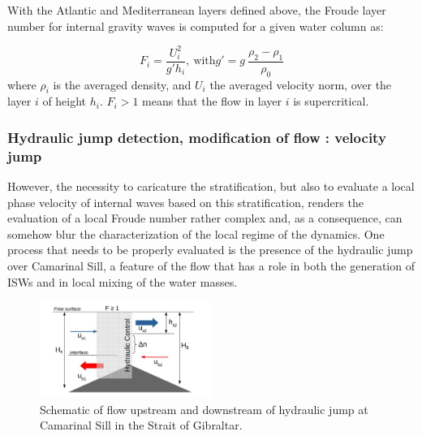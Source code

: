 With the Atlantic and Mediterranean layers defined above, the Froude layer number for internal gravity waves is computed for a given water column as: 

\begin{equation}
F_i=\frac{U_i^2}{g'h_i} , \ \text{with} g'=g \ \frac{\rho_2-\rho_1}{\rho_0}
\end{equation}
where $\rho_i$ is the averaged density, and  $U_i$ the averaged velocity norm, over the layer $i$ of height $h_i$. $F_i>1$ means that the flow in layer $i$ is supercritical.

\subsubsection{Hydraulic jump detection, \color{red}modification of flow : velocity jump\color{black}}
\label{sectiondiagJump}

However, the necessity to caricature the stratification, but also to evaluate a local phase velocity of internal waves based on this stratification, renders the evaluation of a local Froude number rather complex and, as a consequence, can somehow blur the characterization of the local regime of the dynamics. One process that needs to be properly evaluated is the presence of the hydraulic jump over Camarinal Sill, a feature of the flow that has a role in both the generation of ISWs and in local mixing of the water masses.

\begin{figure}[!h]
 \centering
 \includegraphics[width=0.5\textwidth]{./GBR3D/schema_diagressaut.jpg}
 \caption {Schematic of flow upstream and downstream of hydraulic jump at Camarinal Sill in the Strait of Gibraltar.}
  \label{schemaRH}
\end{figure}

